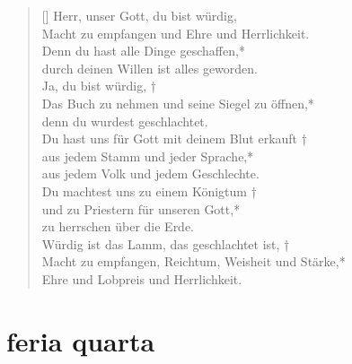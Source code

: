 \vspace{0.6cm}

\begin{verse}[\versewidth]
Herr, unser Gott, du bist würdig,\\
Macht zu empfangen und Ehre und Herrlichkeit.\\
\vin Denn du hast alle Dinge geschaffen,*\\
\vin durch deinen Willen ist alles geworden.\\
Ja, du bist würdig, †\\
Das Buch zu nehmen und seine Siegel zu öffnen,*\\
denn du wurdest geschlachtet.\\
\vin Du hast uns für Gott mit deinem Blut erkauft †\\
\vin aus jedem Stamm und jeder Sprache,*\\
\vin aus jedem Volk und jedem Geschlechte.\\
Du machtest uns zu einem Königtum †\\
und zu Priestern für unseren Gott,*\\
zu herrschen über die Erde.\\

\vin Würdig ist das Lamm, das geschlachtet ist, †\\
\vin Macht zu empfangen, Reichtum, Weisheit und Stärke,*\\
\vin Ehre und Lobpreis und Herrlichkeit.\\

\end{verse}

\section{feria quarta}


